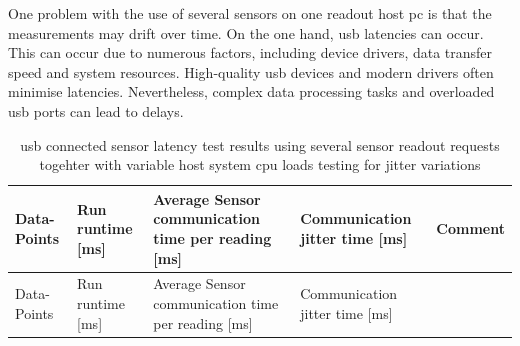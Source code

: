 One problem with the use of several sensors on one readout host \gls{pc}
is that the measurements may drift over time. On the one hand, \gls{usb}
latencies can occur. This can occur due to numerous factors, including
device drivers, data transfer speed and system resources. High-quality
\gls{usb} devices and modern drivers often minimise
latencies. Nevertheless, complex data processing tasks
and overloaded \gls{usb} ports can lead to delays.

\begin{longtable}[]{@{}lllll@{}}
\caption{\gls{usb} connected sensor latency test results using several
sensor readout requests togehter with variable host system cpu loads
testing for jitter variations
\label{(+usb)_connected_sensor_latency_test_results_using_several_sensor_readout_requests_togehter_with_variable_host_system_cpu_loads_testing_for_jitter_variations.csv}}\tabularnewline
\toprule
\begin{minipage}[b]{0.08\columnwidth}\raggedright
Data-Points\strut
\end{minipage} & \begin{minipage}[b]{0.11\columnwidth}\raggedright
Run runtime {[}ms{]}\strut
\end{minipage} & \begin{minipage}[b]{0.35\columnwidth}\raggedright
Average Sensor communication time per reading {[}ms{]}\strut
\end{minipage} & \begin{minipage}[b]{0.22\columnwidth}\raggedright
Communication jitter time {[}ms{]}\strut
\end{minipage} & \begin{minipage}[b]{0.10\columnwidth}\raggedright
Comment\strut
\end{minipage}\tabularnewline
\midrule
\endfirsthead
\toprule
\begin{minipage}[b]{0.08\columnwidth}\raggedright
Data-Points\strut
\end{minipage} & \begin{minipage}[b]{0.11\columnwidth}\raggedright
Run runtime {[}ms{]}\strut
\end{minipage} & \begin{minipage}[b]{0.35\columnwidth}\raggedright
Average Sensor communication time per reading {[}ms{]}\strut
\end{minipage} & \begin{minipage}[b]{0.22\columnwidth}\raggedright
Communication jitter time {[}ms{]}\strut
\end{minipage} & \begin{minipage}[b]{0.10\columnwidth}\raggedright

\end{minipage}
\end{longtable}

